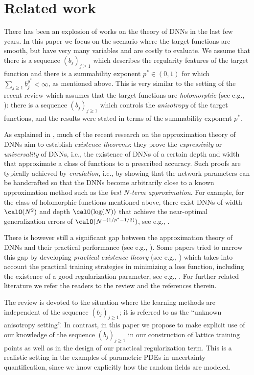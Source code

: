 \section{Related work}
There has been an explosion of works on the theory of DNNs in the last few
years. In this paper we focus on the scenario where the target functions
are smooth, but have very many variables and are costly to evaluate. We
assume that there is a sequence $(b_j)_{j\ge 1}$ which describes the
regularity features of the target function and there is a summability
exponent $p^* \in (0,1)$ for which $\sum_{j\ge 1} b_j^{p^*} < \infty$, as
mentioned above. This is very similar to the setting of the recent review
\cite{ABDM24} which assumes that the target functions are
\emph{holomorphic} (see e.g., \cite{SZ19}): there is a sequence
$(b_j)_{j\ge 1}$ which controls the \emph{anisotropy} of the target
functions, and the results were stated in terms of the summability
exponent $p^*$.

As explained in \cite{ABDM24}, much of the recent research on the
approximation theory of DNNs aim to establish \emph{existence theorems}:
they prove the \emph{expressivity} or \emph{universality} of DNNs, i.e.,
the existence of DNNs of a certain depth and width that approximate a
class of functions to a prescribed accuracy. Such proofs are typically
achieved by \emph{emulation}, i.e., by showing that the network parameters
can be handcrafted so that the DNNs become arbitrarily close to a known
approximation method such as the \emph{best $N$-term approximation}. For
example, for the class of holomorphic functions mentioned above, there
exist DNNs of width $\calO(N^2)$ and depth $\calO(\log(N))$ that achieve
the near-optimal generalization errors of $\calO(N^{-(1/p^*-1/2)})$, see
e.g., \cite[Theorem~7.2]{ABDM24}.

There is however still a significant gap between the approximation theory
of DNNs and their practical performance (see e.g., \cite{AD21,GV24}). Some
papers tried to narrow this gap by developing \emph{practical existence
theory} (see e.g., \cite{ABDM25}) which takes into account the practical
training strategies in minimizing a loss function, including the existence
of a good regularization parameter, see e.g., \cite[Theorem~8.1]{ABDM24}.
For further related literature we refer the readers to the review
\cite{ABDM24} and the references therein.

The review \cite{ABDM24} is devoted to the situation where the learning
methods are independent of the sequence $(b_j)_{j\ge1}$; it is referred to
as the ``unknown anisotropy setting''. In contrast, in this paper we
propose to make explicit use of our knowledge of the sequence
$(b_j)_{j\ge1}$ in our construction of lattice training points as well as
in the design of our practical regularization term. This is a realistic
setting in the examples of parametric PDEs in uncertainty quantification,
since we know explicitly how the random fields are modeled.

